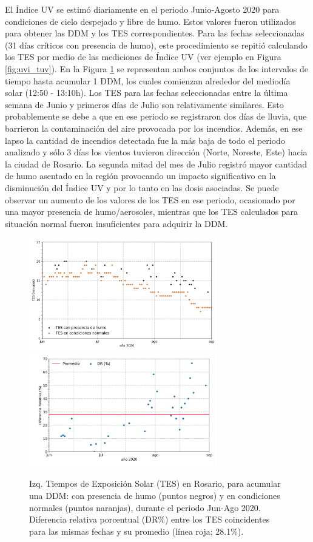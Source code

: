 El Índice UV se estimó diariamente en el periodo Junio-Agosto 2020 para condiciones de cielo despejado y libre de humo. Estos valores fueron utilizados para obtener las DDM y los TES correspondientes. Para las fechas seleccionadas (31 días críticos con presencia de humo), este procedimiento se repitió calculando los TES por medio de las mediciones de Índice UV (ver ejemplo en Figura \ref{fig:uvi_tuv}). En la Figura \ref{fig:dr} se representan ambos conjuntos de los intervalos de tiempo hasta acumular 1 DDM, los cuales comienzan alrededor del mediodía solar (12:50 - 13:10h). Los TES para las fechas seleccionadas entre la última semana de Junio y primeros días de Julio son relativamente similares. Esto probablemente se debe a que en ese periodo se registraron dos días de lluvia, que barrieron la contaminación del aire provocada por los incendios. Además, en ese lapso la cantidad de incendios detectada fue la más baja de todo el periodo analizado y sólo 3 días los vientos tuvieron dirección (Norte, Noreste, Este) hacia la ciudad de Rosario. La segunda mitad del mes de Julio registró mayor cantidad de humo asentado en la región provocando un impacto significativo en la disminución del Índice UV y por lo tanto en las dosis asociadas. Se puede observar un aumento de los valores de los TES en ese periodo, ocasionado por una mayor presencia de humo/aerosoles, mientras que los TES calculados para situación normal fueron insuficientes para adquirir la DDM.

\begin{figure}[H]
    \centering
    \includegraphics[width=8.2cm]{Graphics/image12.png}
    \includegraphics[width=8.2cm]{Graphics/image11.png}
    \caption{Izq. Tiempos de Exposición Solar (TES) en Rosario, para acumular una DDM: con presencia de humo (puntos negros) y en condiciones normales (puntos naranjas), durante el periodo Jun-Ago 2020. Diferencia relativa porcentual (DR\%) entre los TES coincidentes para las mismas fechas y su promedio (línea roja; 28.1\%).}
    \label{fig:dr}
\end{figure}

